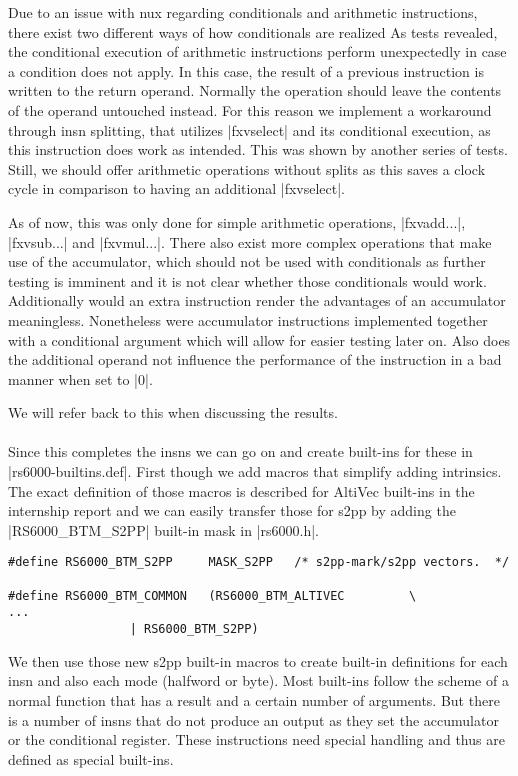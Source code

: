 Due to an issue with nux regarding conditionals and arithmetic instructions, there exist two different ways of how conditionals are realized
As tests revealed, the conditional execution of arithmetic instructions perform unexpectedly in case a condition does not apply.
In this case, the result of a previous instruction is written to the return operand.
Normally the operation should leave the contents of the operand untouched instead.
For this reason we implement a workaround through insn splitting, that utilizes |fxvselect| and its conditional execution, as this instruction does work as intended.
This was shown by another series of tests.
Still, we should offer arithmetic operations without splits as this saves a clock cycle in comparison to having an additional |fxvselect|.

As of now, this was only done for simple arithmetic operations, |fxvadd...|, |fxvsub...| and |fxvmul...|.
There also exist more complex operations that make use of the accumulator, which should not be used with conditionals as further testing is imminent and it is not clear whether those conditionals would work.
Additionally would an extra instruction render the advantages of an accumulator meaningless.
Nonetheless were accumulator instructions implemented together with a conditional argument which will allow for easier testing later on.
Also does the additional operand not influence the performance of the instruction in a bad manner when set to |0|.

We will refer back to this when discussing the results.
\\
\\
Since this completes the insns we can go on and create built-ins for these in |rs6000-builtins.def|.
First though we add macros that simplify adding intrinsics.
The exact definition of those macros is described for AltiVec built-ins in the internship report \citep{heimbrecht_2017internship} and we can easily transfer those for s2pp by adding the |RS6000_BTM_S2PP| built-in mask in |rs6000.h|.
\begin{lstlisting}
#define RS6000_BTM_S2PP     MASK_S2PP   /* s2pp-mark/s2pp vectors.  */

#define RS6000_BTM_COMMON   (RS6000_BTM_ALTIVEC         \
...
                 | RS6000_BTM_S2PP)
\end{lstlisting}

We then use those new s2pp built-in macros to create built-in definitions for each insn and also each mode (halfword or byte).
Most built-ins follow the scheme of a normal function that has a result and a certain number of arguments.
But there is a number of insns that do not produce an output as they set the accumulator or the conditional register.
These instructions need special handling and thus are defined as special built-ins.

